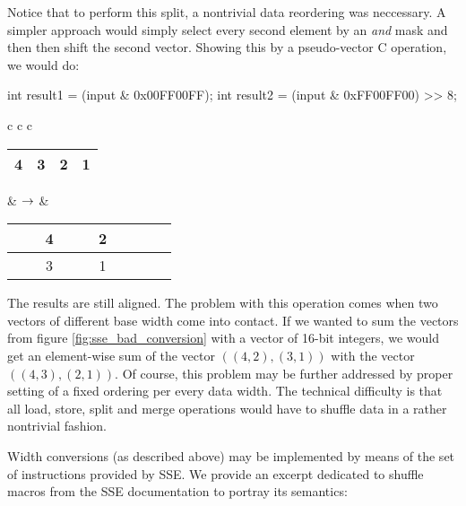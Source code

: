 Notice that to perform this split, a nontrivial data reordering was neccessary. A simpler approach would simply select every second element by an \emph{and} mask and then then shift the second vector. Showing this by a pseudo-vector C operation, we would do:

\mybeginfig
\begin{code}
int result1 = (input & 0x00FF00FF);
int result2 = (input & 0xFF00FF00) >> 8; 
\end{code}
\begin{longtable}{ c c c }
\begin{tabular}{|c|c|c|c|}
\hline
 4 & 3 & 2 & 1 \tabularnewline
\hline
\end{tabular}
&
$\rightarrow$
&
\begin{tabular}{|c|c|c|c|c|c|c|c|}
\hline
 \ \ & 4 & \ \ & 2 \tabularnewline
\hline
 \ \ & 3 & \ \ & 1 \tabularnewline
\hline
\end{tabular}
\end{longtable}

The results are still aligned. The problem with this operation comes when two vectors of different base width come into contact. If we wanted to sum the vectors from figure \ref{fig:sse_bad_conversion} with a vector of 16-bit integers, we would get an element-wise sum of the vector $((4,2),(3,1))$ with the vector $((4,3),(2,1))$. Of course, this problem may be further addressed by proper setting of a fixed ordering per every data width. The technical difficulty is that all load, store, split and merge operations would have to shuffle data in a rather nontrivial fashion. 


Width conversions (as described above) may be implemented by means of the set of  instructions provided by SSE. We provide an excerpt dedicated to shuffle macros from the SSE documentation \cite{reference} to portray its semantics: 




